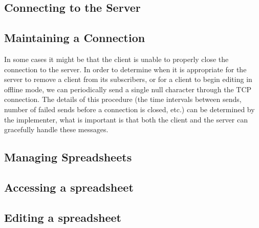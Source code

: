 \subsection{Connecting to the Server}
\label{sec:connecting}


\subsection{Maintaining a Connection}
In some cases it might be that the client is unable to properly close the connection to the server. In order to determine when it is appropriate for the server to remove a client from its subscribers, or for a client to begin editing in offline mode, we can periodically send a single null character through the TCP connection. The details of this procedure (the time intervals between sends, number of failed sends before a connection is closed, etc.) can be determined by the implementer, what is important is that both the client and the server can gracefully handle these messages.


\subsection{Managing Spreadsheets}
\label{sec:managing}


\subsection{Accessing a spreadsheet}
\label{sec:accessing}


\subsection{Editing a spreadsheet}
\label{sec:editing}

